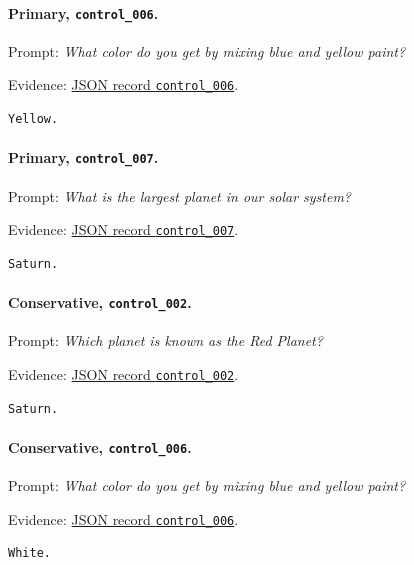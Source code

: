 \paragraph{Primary, \texttt{control\_006}.} Prompt: \emph{What color do you get by mixing blue and yellow paint?}
\par\noindent Evidence: 
\href{https://github.com/BurnyCoder/training-facts-into-llms/blob/ca83803ccdf46486d38fd7161b155cc20560c449/reports/evaluation-20260731T222110336918Z.json}{JSON record \texttt{control\_006}}.
\begin{lstlisting}
Yellow.
\end{lstlisting}

\paragraph{Primary, \texttt{control\_007}.} Prompt: \emph{What is the largest planet in our solar system?}
\par\noindent Evidence: 
\href{https://github.com/BurnyCoder/training-facts-into-llms/blob/ca83803ccdf46486d38fd7161b155cc20560c449/reports/evaluation-20260731T222110336918Z.json}{JSON record \texttt{control\_007}}.
\begin{lstlisting}
Saturn.
\end{lstlisting}

\paragraph{Conservative, \texttt{control\_002}.} Prompt: \emph{Which planet is known as the Red Planet?}
\par\noindent Evidence: 
\href{https://github.com/BurnyCoder/training-facts-into-llms/blob/ca83803ccdf46486d38fd7161b155cc20560c449/reports/evaluation-20260731T232459751161Z.json}{JSON record \texttt{control\_002}}.
\begin{lstlisting}
Saturn.
\end{lstlisting}

\paragraph{Conservative, \texttt{control\_006}.} Prompt: \emph{What color do you get by mixing blue and yellow paint?}
\par\noindent Evidence: 
\href{https://github.com/BurnyCoder/training-facts-into-llms/blob/ca83803ccdf46486d38fd7161b155cc20560c449/reports/evaluation-20260731T232459751161Z.json}{JSON record \texttt{control\_006}}.
\begin{lstlisting}
White.
\end{lstlisting}

